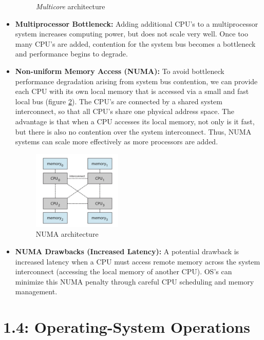 \documentclass[12pt]{article}
\begin{document}
\begin{itemize}
\begin{figure}[ht]
            \caption{\textit{Multicore} architecture}
            \label{fig:multicore-architecture}
        \end{figure}
    \item \textbf{Multiprocessor Bottleneck:} Adding additional CPU's to a multiprocessor system increases computing power, but does not scale very well. Once too many CPU's are added, contention for the system bus becomes a bottleneck and performance begins to degrade.
    \item \textbf{Non-uniform Memory Access (NUMA):} To avoid bottleneck performance degradation arising from system bus contention, we can provide each CPU with its own local memory that is accessed via a small and fast local bus (figure \ref{fig:numa-architecture}). The CPU's are connected by a shared system interconnect, so that all CPU's share one physical address space. The advantage is that when a CPU accesses its local memory, not only is it fast, but there is also no contention over the system interconnect. Thus, NUMA systems can scale more effectively as more processors are added.
        \begin{figure}[ht]
            \centering
            \includegraphics[width=0.4\textwidth]{figures/numa-architecture.jpg}
            \caption{NUMA architecture}
            \label{fig:numa-architecture}
        \end{figure}
    \item \textbf{NUMA Drawbacks (Increased Latency):} A potential drawback is increased latency when a CPU must access remote memory across the system interconnect (accessing the local memory of another CPU). OS's can minimize this NUMA penalty through careful CPU scheduling and memory management.
\end{itemize}

\section*{1.4: Operating-System Operations}
\end{document}
